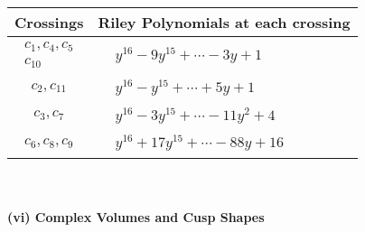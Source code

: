 \documentclass[1p]{elsarticle_modified}
\theoremstyle{definition}
\begin{document}
\begin{tabular}{m{50pt}|m{274pt}}
Crossings & \hspace{64pt}Riley Polynomials at each crossing \\
\hline $$\begin{aligned}c_{1},c_{4},c_{5}\\c_{10}\end{aligned}$$&$\begin{aligned}
&y^{16}-9 y^{15}+\cdots-3 y+1
\end{aligned}$\\
\hline $$\begin{aligned}c_{2},c_{11}\end{aligned}$$&$\begin{aligned}
&y^{16}- y^{15}+\cdots+5 y+1
\end{aligned}$\\
\hline $$\begin{aligned}c_{3},c_{7}\end{aligned}$$&$\begin{aligned}
&y^{16}-3 y^{15}+\cdots-11 y^2+4
\end{aligned}$\\
\hline $$\begin{aligned}c_{6},c_{8},c_{9}\end{aligned}$$&$\begin{aligned}
&y^{16}+17 y^{15}+\cdots-88 y+16
\end{aligned}$\\
\hline
\end{tabular}\\~\\
\newpage\flushleft \textbf{(vi) Complex Volumes and Cusp Shapes}
\end{document}
